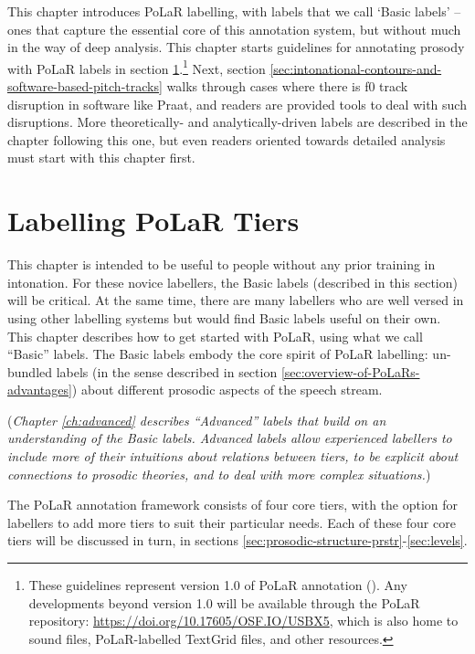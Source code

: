 \documentclass[11pt, twoside]{memoir}
\begin{document}
This chapter introduces PoLaR labelling, with labels that we call ‘Basic labels’ – ones that capture the essential core of this annotation system, but without much in the way of deep analysis. This chapter starts guidelines for annotating prosody with PoLaR labels in section  \ref{sec:labelling-polar-tiers}.\footnote{These guidelines represent version 1.0 of PoLaR annotation (\citealt{ahn-21}). Any developments beyond version 1.0 will be available through the PoLaR repository: \href{https://doi.org/10.17605/OSF.IO/USBX5}{https://doi.org/10.17605/OSF.IO/USBX5}, which is also home to sound files, PoLaR-labelled TextGrid files, and other resources.} Next, section \ref{sec:intonational-contours-and-software-based-pitch-tracks} walks through cases where there is f0 track disruption in software like Praat, and readers are provided tools to deal with such disruptions. More theoretically- and analytically-driven labels are described in the chapter following this one, but even readers oriented towards detailed analysis must start with this chapter first.

\section{Labelling PoLaR Tiers}\label{sec:labelling-polar-tiers}

This chapter is intended to be useful to people without any prior training in intonation. For these novice labellers, the Basic labels (described in this section) will be critical. At the same time, there are many labellers who are well versed in using other labelling systems but would find Basic labels useful on their own. This chapter describes how to get started with PoLaR, using what we call “Basic” labels. The Basic labels embody the core spirit of PoLaR labelling: un-bundled labels (in the sense described in section \ref{sec:overview-of-PoLaRs-advantages}) about different prosodic aspects of the speech stream.

(\textit{Chapter \ref{ch:advanced} describes “Advanced” labels that build on an understanding of the Basic labels. Advanced labels allow experienced labellers to include more of their intuitions about relations between tiers, to be explicit about connections to prosodic theories, and to deal with more complex situations.})

The PoLaR annotation framework consists of four core tiers, with the option for labellers to add more tiers to suit their particular needs. Each of these four core tiers will be discussed in turn, in sections \ref{sec:prosodic-structure-prstr}-\ref{sec:levels}.
\end{document}
